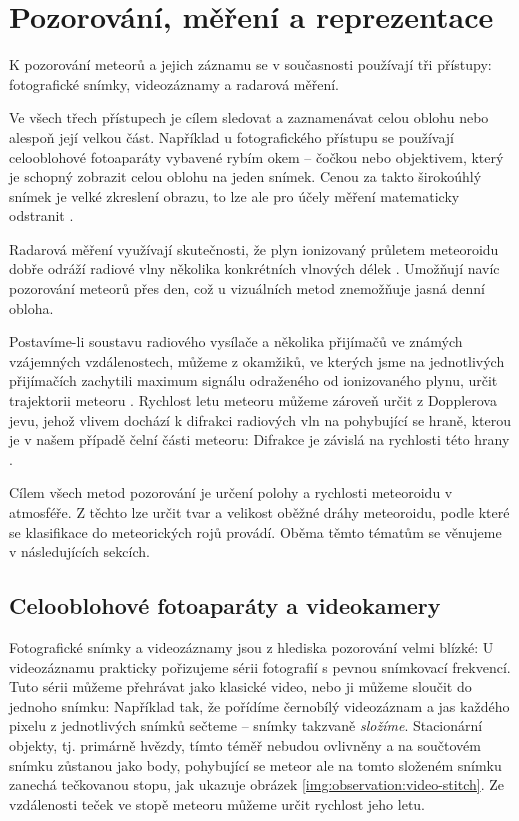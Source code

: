 \chapter{Pozorování, měření a reprezentace}%
K pozorování meteorů a jejich záznamu se v současnosti používají tři přístupy: fotografické snímky, videozáznamy a radarová měření.

Ve všech třech přístupech je cílem sledovat a zaznamenávat celou oblohu nebo alespoň její velkou část. Například u fotografického přístupu se používají celooblohové fotoaparáty vybavené rybím okem \cite{ceplecha} -- čočkou nebo objektivem, který je schopný zobrazit celou oblohu na jeden snímek. Cenou za takto širokoúhlý snímek je velké zkreslení obrazu, to lze ale pro účely měření matematicky odstranit \cite{ceplecha}.

\smallskip

Radarová měření využívají skutečnosti, že plyn ionizovaný průletem meteoroidu dobře odráží radiové vlny několika konkrétních vlnových délek \cite{radiosurvey}. Umožňují navíc pozorování meteorů přes den, což u vizuálních metod znemožňuje jasná denní obloha.

Postavíme-li soustavu radiového vysílače a několika přijímačů ve známých vzájemných vzdálenostech, můžeme z okamžiků, ve kterých jsme na jednotlivých přijímačích zachytili maximum signálu odraženého od ionizovaného plynu, určit trajektorii meteoru \cite{radiosurvey}. Rychlost letu meteoru můžeme zároveň určit z Dopplerova jevu, jehož vlivem dochází k difrakci radiových vln na pohybující se hraně, kterou je v našem případě čelní části meteoru: Difrakce je závislá na rychlosti této hrany \cite{radiosurvey}.

\smallskip

Cílem všech metod pozorování je určení polohy a rychlosti meteoroidu v atmosféře. Z těchto lze určit tvar a velikost oběžné dráhy meteoroidu, podle které se klasifikace do meteorických rojů provádí. Oběma těmto tématům se věnujeme v následujících sekcích.

\section{Celooblohové fotoaparáty a videokamery}%
Fotografické snímky a videozáznamy jsou z hlediska pozorování velmi blízké: U videozáznamu prakticky pořizujeme sérii fotografií s pevnou snímkovací frekvencí. Tuto sérii můžeme přehrávat jako klasické video, nebo ji můžeme sloučit do jednoho snímku: Například tak, že pořídíme černobílý videozáznam a jas každého pixelu z jednotlivých snímků sečteme -- snímky takzvaně \textit{složíme}. Stacionární objekty, tj. primárně hvězdy, tímto téměř nebudou ovlivněny a na součtovém snímku zůstanou jako body, pohybující se meteor ale na tomto složeném snímku zanechá tečkovanou stopu, jak ukazuje obrázek \ref{img:observation:video-stitch}. Ze vzdálenosti teček ve stopě meteoru můžeme určit rychlost jeho letu.

